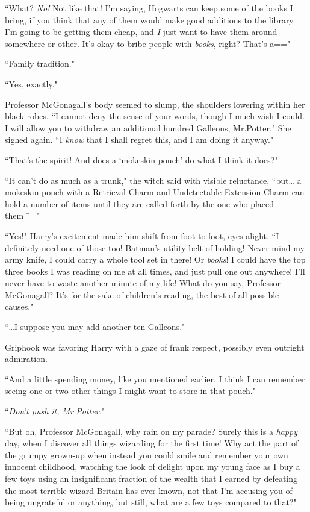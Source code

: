``What? \emph{No!} Not like that! I'm saying, Hogwarts can keep some of the books I bring, if you think that any of them would make good additions to the library. I'm going to be getting them cheap, and \emph{I} just want to have them around somewhere or other. It's okay to bribe people with \emph{books}, right? That's a\==="

``Family tradition."

``Yes, exactly."

Professor McGonagall's body seemed to slump, the shoulders lowering within her black robes. ``I cannot deny the sense of your words, though I much wish I could. I will allow you to withdraw an additional hundred Galleons, Mr.\?Potter." She sighed again. ``I \emph{know} that I shall regret this, and I am doing it anyway."

``That's the spirit! And does a `mokeskin pouch' do what I think it does?"

``It can't do as much as a trunk," the witch said with visible reluctance, ``but{\ldots} a mokeskin pouch with a Retrieval Charm and Undetectable Extension Charm can hold a number of items until they are called forth by the one who placed them\==="

``Yes!" Harry's excitement made him shift from foot to foot, eyes alight. ``I definitely need one of those too! Batman's utility belt of holding! Never mind my army knife, I could carry a whole tool set in there! Or \emph{books}! I could have the top three books I was reading on me at all times, and just pull one out anywhere! I'll never have to waste another minute of my life! What do you say, Professor McGonagall? It's for the sake of children's reading, the best of all possible causes."

``{\ldots}I suppose you may add another ten Galleons."

Griphook was favoring Harry with a gaze of frank respect, possibly even outright admiration.

``And a little spending money, like you mentioned earlier. I think I can remember seeing one or two other things I might want to store in that pouch."

``\emph{Don't push it, Mr.\?Potter.}"

``But oh, Professor McGonagall, why rain on my parade? Surely this is a \emph{happy} day, when I discover all things wizarding for the first time! Why act the part of the grumpy grown-up when instead you could smile and remember your own innocent childhood, watching the look of delight upon my young face as I buy a few toys using an insignificant fraction of the wealth that I earned by defeating the most terrible wizard Britain has ever known, not that I'm accusing you of being ungrateful or anything, but still, what are a few toys compared to that?"

